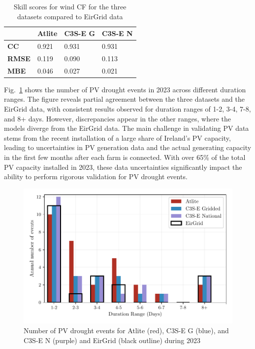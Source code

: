 \documentclass[a4paper, 11p1t]{article}
\begin{document}
\begin{table}[!ht]
	\centering
	\begin{tabular}{l|lll|}
	\cline{2-4}
	& \textbf{Atlite} & \textbf{C3S-E G} & \textbf{C3S-E N} \\ \hline
	\multicolumn{1}{|l|}{\textbf{CC}}   & 0.921           & 0.931            & 0.931            \\ \hline
	\multicolumn{1}{|l|}{\textbf{RMSE}} & 0.119           & 0.090            & 0.113            \\ \hline
	\multicolumn{1}{|l|}{\textbf{MBE}}   & 0.046           & 0.027           & 0.021           \\ \hline
	\end{tabular}
	\caption{Skill scores for wind CF for the three datasets compared to EirGrid data}
	\label{tab:pv_skill_scores}
\end{table}

Fig.~\ref{fig:bar_number_events_verification_pv} shows the number of PV drought events in 2023 across different duration ranges. The figure reveals partial agreement between the three datasets and the EirGrid data, with consistent results observed for duration ranges of 1-2, 3-4, 7-8, and 8+ days. However, discrepancies appear in the other ranges, where the models diverge from the EirGrid data. The main challenge in validating PV data stems from the recent installation of a large share of Ireland’s PV capacity, leading to uncertainties in PV generation data and the actual generating capacity in the first few months after each farm is connected. With over 65\% of the total PV capacity installed in 2023, these data uncertainties significantly impact the ability to perform rigorous validation for PV drought events.

\begin{figure}[!ht]
	\centering
	\includegraphics{verification_pv_number_events.pdf}
	\caption{Number of PV drought events for Atlite (red), C3S-E G (blue), and C3S-E N (purple) and EirGrid (black outline) during 2023}
	\label{fig:bar_number_events_verification_pv}
\end{figure}
\end{document}
